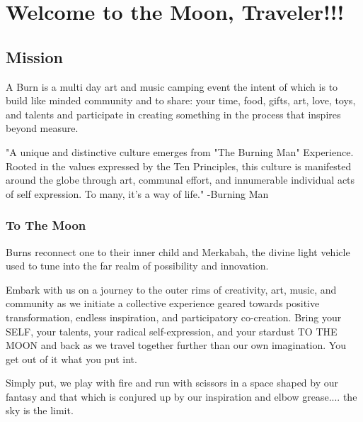 %
%

\chapter[Welcome]{Welcome to the Moon, Traveler!!!}


\ifisflight
\putchapterthumb
\fi

\section*{Mission}
A Burn is a  multi day art and music camping event the intent of which is to build like minded community and to share:
your time, food, gifts, art, love, toys, and talents and participate in creating something in the process that inspires beyond measure.

"A unique and distinctive culture emerges from "The Burning Man" Experience. Rooted in the values expressed by the Ten Principles, this culture is manifested around the globe through art, communal effort, and innumerable individual acts of self expression. To many, it's a way of life." -Burning Man

\subsection*{To The Moon}
Burns reconnect one to their inner child and Merkabah, the divine light vehicle used to tune into the far realm of possibility and innovation.

Embark with us on a journey to the outer rims of creativity, art, music, and community as we initiate a collective experience geared towards positive transformation, endless inspiration, and participatory
co-creation. Bring your SELF, your talents, your radical self-expression, and your stardust TO THE MOON and back as we travel together further than our own imagination. You get out of it what you put int.

Simply put, we play with fire and run with scissors in a space shaped by our fantasy and that which is conjured up by our inspiration and elbow grease.... the sky is the limit. 

